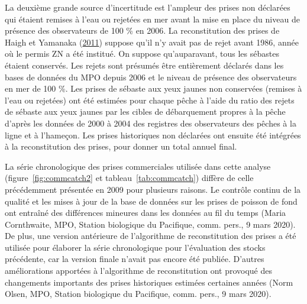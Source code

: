 \documentclass[french,11pt]{book}
\begin{document}
La deuxième grande source d'incertitude est l'ampleur des prises non déclarées qui étaient remises à l'eau ou rejetées en mer avant la mise en place du niveau de présence des observateurs de 100 \% en 2006. La reconstitution des prises de Haigh et Yamanaka (\protect\hyperlink{ref-haigh2011}{2011}) suppose qu'il n'y avait pas de rejet avant 1986, année où le permis ZN a été institué. On suppose qu'auparavant, tous les sébastes étaient conservés. Les rejets sont présumés être entièrement déclarés dans les bases de données du MPO depuis 2006 et le niveau de présence des observateurs en mer de 100 \%. Les prises de sébaste aux yeux jaunes non conservées (remises à l'eau ou rejetées) ont été estimées pour chaque pêche à l'aide du ratio des rejets de sébaste aux yeux jaunes par les cibles de débarquement propres à la pêche d'après les données de 2000 à 2004 des registres des observateurs des pêches à la ligne et à l'hameçon. Les prises historiques non déclarées ont ensuite été intégrées à la reconstitution des prises, pour donner un total annuel final.

La série chronologique des prises commerciales utilisée dans cette analyse (figure~\ref{fig:commcatch2} et tableau~\ref{tab:commcatch}) diffère de celle précédemment présentée en 2009 pour plusieurs raisons. Le contrôle continu de la qualité et les mises à jour de la base de données sur les prises de poisson de fond ont entraîné des différences mineures dans les données au fil du temps (Maria Cornthwaite, MPO, Station biologique du Pacifique, comm. pers., 9 mars 2020). De plus, une version antérieure de l'algorithme de reconstitution des prises a été utilisée pour élaborer la série chronologique pour l'évaluation des stocks précédente, car la version finale n'avait pas encore été publiée. D'autres améliorations apportées à l'algorithme de reconstitution ont provoqué des changements importants des prises historiques estimées certaines années (Norm Olsen, MPO, Station biologique du Pacifique, comm. pers., 9 mars 2020).
\end{document}
